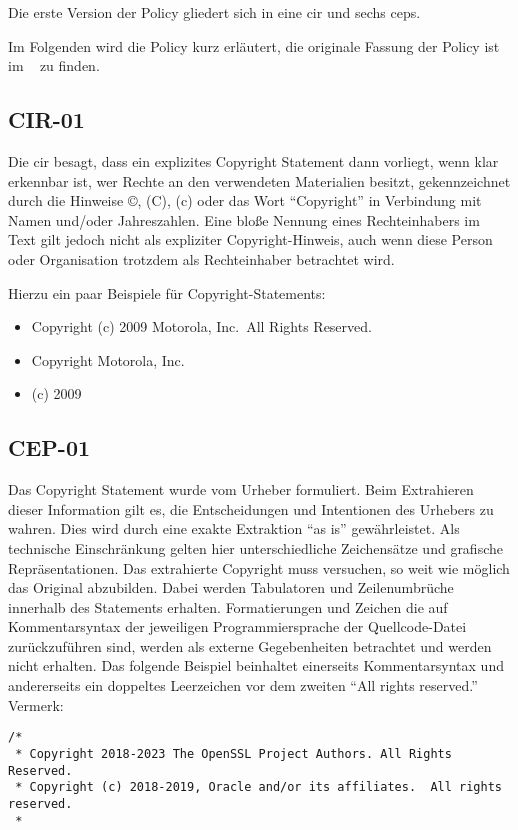 Die erste Version der Policy gliedert sich in eine \gls{cir} und sechs \glspl{cep}.

Im Folgenden wird die Policy kurz erläutert, die originale Fassung der Policy ist im ~ zu finden.


\subsection{CIR-01}\label{subsec:cir-01}

Die \gls{cir} besagt, dass ein explizites Copyright Statement dann vorliegt, wenn klar erkennbar ist, wer Rechte an den verwendeten Materialien besitzt, gekennzeichnet durch die Hinweise ©, (C), (c) oder das Wort \enquote{Copyright} in Verbindung mit Namen und/oder Jahreszahlen.
Eine bloße Nennung eines Rechteinhabers im Text gilt jedoch nicht als expliziter Copyright-Hinweis, auch wenn diese Person oder Organisation trotzdem als Rechteinhaber betrachtet wird.

Hierzu ein paar Beispiele für Copyright-Statements:
\begin{itemize}
    \item Copyright (c) 2009 Motorola, Inc.\ All Rights Reserved.
    \item Copyright Motorola, Inc.
    \item (c) 2009
\end{itemize}


\subsection{CEP-01}\label{subsec:cep-01}

Das Copyright Statement wurde vom Urheber formuliert.
Beim Extrahieren dieser Information gilt es, die Entscheidungen und Intentionen des Urhebers zu wahren.
Dies wird durch eine exakte Extraktion \enquote{as is} gewährleistet.
Als technische Einschränkung gelten hier unterschiedliche Zeichensätze und grafische Repräsentationen.
Das extrahierte Copyright muss versuchen, so weit wie möglich das Original abzubilden.
Dabei werden Tabulatoren und Zeilenumbrüche innerhalb des Statements erhalten.
Formatierungen und Zeichen die auf Kommentarsyntax der jeweiligen Programmiersprache der Quellcode-Datei zurückzuführen sind, werden als externe Gegebenheiten betrachtet und werden nicht erhalten.
Das folgende Beispiel beinhaltet einerseits Kommentarsyntax und andererseits ein doppeltes Leerzeichen vor dem zweiten \enquote{All rights reserved.} Vermerk:
\begin{lstlisting}[numbers=none, keepspaces=true]
/*
 * Copyright 2018-2023 The OpenSSL Project Authors. All Rights Reserved.
 * Copyright (c) 2018-2019, Oracle and/or its affiliates.  All rights reserved.
 *
\end{lstlisting}

